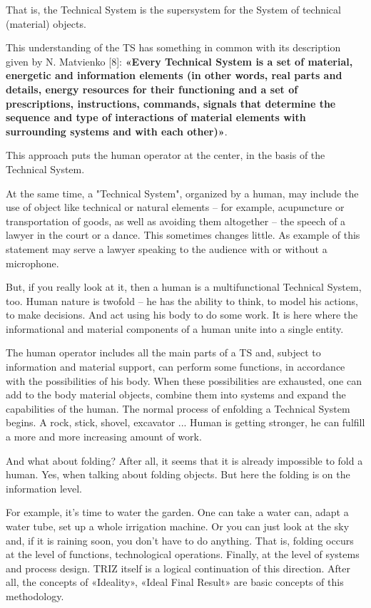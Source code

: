 \documentclass[11pt,a4paper]{article}
\begin{document}
That is, the Technical System is the supersystem for the System of technical
(material) objects.

This understanding of the TS has something in common with its description
given by N. Matvienko [8]: \textbf{«Every Technical System is a set of
  material, energetic and information elements (in other words, real parts and
  details, energy resources for their functioning and a set of prescriptions,
  instructions, commands, signals that determine the sequence and type of
  interactions of material elements with surrounding systems and with each
  other)»}.

This approach puts the human operator at the center, in the basis of the
Technical System.

At the same time, a "Technical System", organized by a human, may include the
use of object like technical or natural elements -- for example, acupuncture
or transportation of goods, as well as avoiding them altogether -- the speech
of a lawyer in the court or a dance. This sometimes changes little. As example
of this statement may serve a lawyer speaking to the audience with or without
a microphone.

But, if you really look at it, then a human is a multifunctional Technical
System, too.  Human nature is twofold -- he has the ability to think, to model
his actions, to make decisions. And act using his body to do some work.  It is
here where the informational and material components of a human unite into a
single entity.

The human operator includes all the main parts of a TS and, subject to
information and material support, can perform some functions, in accordance
with the possibilities of his body. When these possibilities are exhausted,
one can add to the body material objects, combine them into systems and expand
the capabilities of the human. The normal process of enfolding a Technical
System begins. A rock, stick, shovel, excavator ... Human is getting stronger,
he can fulfill a more and more increasing amount of work.

And what about folding?  After all, it seems that it is already impossible to
fold a human. Yes, when talking about folding objects. But here the folding is
on the information level.

For example, it's time to water the garden. One can take a water can, adapt a
water tube, set up a whole irrigation machine. Or you can just look at the sky
and, if it is raining soon, you don't have to do anything. That is, folding
occurs at the level of functions, technological operations. Finally, at the
level of systems and process design. TRIZ itself is a logical continuation of
this direction. After all, the concepts of «Ideality», «Ideal Final Result»
are basic concepts of this methodology.
\end{document}
